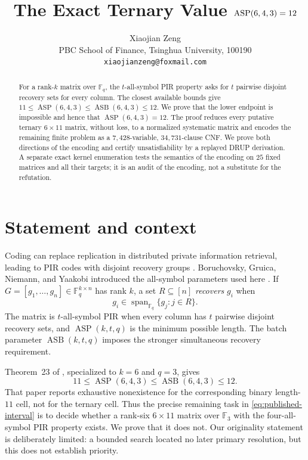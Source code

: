 \documentclass[11pt]{article}
\title{The Exact Ternary Value $\ASP(6,4,3)=12$}
\author{Xiaojian Zeng\\
  \small PBC School of Finance, Tsinghua University, 100190\\
  \small \texttt{xiaojianzeng@foxmail.com}}
\date{}
\newcommand{\F}{\mathbb F}
\newcommand{\ASP}{\operatorname{ASP}}
\newcommand{\ASB}{\operatorname{ASB}}
\begin{document}
\maketitle

\begin{abstract}
For a rank-$k$ matrix over $\F_q$, the $t$-all-symbol PIR property asks
for $t$ pairwise disjoint recovery sets for every column.  The closest
available bounds give
$11\leq\ASP(6,4,3)\leq\ASB(6,4,3)\leq12$.
We prove that the lower endpoint is impossible and hence that
$\ASP(6,4,3)=12$.  The proof reduces every putative ternary
$6\times11$ matrix, without loss, to a normalized systematic matrix and
encodes the remaining finite problem as a $7{,}428$-variable,
$34{,}731$-clause CNF.  We prove both directions of the encoding and
certify unsatisfiability by a replayed DRUP derivation.  A separate exact
kernel enumeration tests the semantics of the encoding on $25$ fixed
matrices and all their targets; it is an audit of the encoding, not a
substitute for the refutation.
\end{abstract}

\section{Statement and context}

Coding can replace replication in distributed private information
retrieval, leading to PIR codes with disjoint recovery groups
\cite{FazeliVardyYaakobi2015}.  Boruchovsky, Gruica, Niemann, and Yaakobi
introduced the all-symbol parameters used here
\cite{BoruchovskyEtAl2026}.  If
$G=[g_1,\ldots,g_n]\in\F_q^{k\times n}$ has rank $k$, a set
$R\subseteq[n]$ \emph{recovers} $g_i$ when
\[
  g_i\in\operatorname{span}_{\F_q}\{g_j:j\in R\}.
\]
The matrix is $t$-all-symbol PIR when every column has $t$ pairwise
disjoint recovery sets, and $\ASP(k,t,q)$ is the minimum possible
length.  The batch parameter $\ASB(k,t,q)$ imposes the stronger
simultaneous recovery requirement.

Theorem~23 of \cite{BoruchovskyEtAl2026}, specialized to $k=6$ and
$q=3$, gives
\begin{equation}\label{eq:published-interval}
  11\leq\ASP(6,4,3)\leq\ASB(6,4,3)\leq12.
\end{equation}
That paper reports exhaustive nonexistence for the corresponding binary
length-$11$ cell, not for the ternary cell.  Thus the precise remaining
task in \eqref{eq:published-interval} is to decide whether a rank-six
$6\times11$ matrix over $\F_3$ with the four-all-symbol PIR property
exists.  We prove that it does not.  Our originality statement is
deliberately limited: a bounded search located no later primary
resolution, but this does not establish priority.
\end{document}
